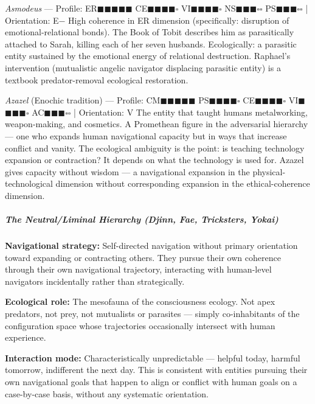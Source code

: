 \textit{Asmodeus} — Profile: ER$\blacksquare$$\blacksquare$$\blacksquare$$\blacksquare$$\blacksquare$ CE$\blacksquare$$\blacksquare$$\blacksquare$$\blacksquare$$\square$ VI$\blacksquare$$\blacksquare$$\blacksquare$$\blacksquare$$\square$ NS$\blacksquare$$\blacksquare$$\blacksquare$$\square$$\square$ PS$\blacksquare$$\blacksquare$$\blacksquare$$\square$$\square$ | Orientation: E− High coherence in ER dimension (specifically: disruption of emotional-relational bonds). The Book of Tobit describes him as parasitically attached to Sarah, killing each of her seven husbands. Ecologically: a parasitic entity sustained by the emotional energy of relational destruction. Raphael's intervention (mutualistic angelic navigator displacing parasitic entity) is a textbook predator-removal ecological restoration.


\textit{Azazel} (Enochic tradition) — Profile: CM$\blacksquare$$\blacksquare$$\blacksquare$$\blacksquare$$\blacksquare$ PS$\blacksquare$$\blacksquare$$\blacksquare$$\blacksquare$$\square$ CE$\blacksquare$$\blacksquare$$\blacksquare$$\blacksquare$$\square$ VI$\blacksquare$$\blacksquare$$\blacksquare$$\blacksquare$$\square$ AC$\blacksquare$$\blacksquare$$\blacksquare$$\square$$\square$ | Orientation: V The entity that taught humans metalworking, weapon-making, and cosmetics. A Promethean figure in the adversarial hierarchy — one who expands human navigational capacity but in ways that increase conflict and vanity. The ecological ambiguity is the point: is teaching technology expansion or contraction? It depends on what the technology is used for. Azazel gives capacity without wisdom — a navigational expansion in the physical-technological dimension without corresponding expansion in the ethical-coherence dimension.


\subparagraph*{The Neutral/\allowbreak Liminal Hierarchy (Djinn, Fae, Tricksters, Yokai)}


\textbf{Navigational strategy:} Self-directed navigation without primary orientation toward expanding or contracting others. They pursue their own coherence through their own navigational trajectory, interacting with human-level navigators incidentally rather than strategically.


\textbf{Ecological role:} The mesofauna of the consciousness ecology. Not apex predators, not prey, not mutualists or parasites — simply co-inhabitants of the configuration space whose trajectories occasionally intersect with human experience.


\textbf{Interaction mode:} Characteristically unpredictable — helpful today, harmful tomorrow, indifferent the next day. This is consistent with entities pursuing their own navigational goals that happen to align or conflict with human goals on a case-by-case basis, without any systematic orientation.



